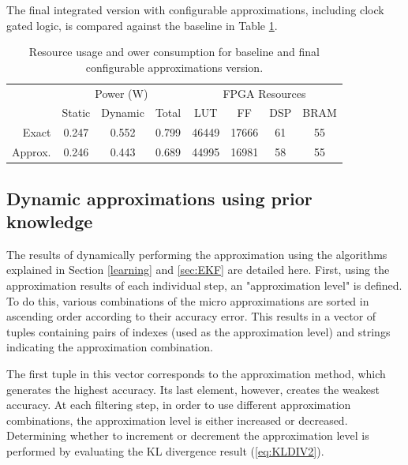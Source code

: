 \par The final integrated version with configurable approximations, including clock gated logic, is compared against the baseline in Table \ref{table:integrated}.

\begin{table}[h]
\begin{tabular}{r c c c c c c c}
\toprule
 & \multicolumn{3}{c}{Power (W)} & \multicolumn{4}{c}{FPGA Resources}\\
 & Static & Dynamic & Total & LUT & FF & DSP & BRAM\\
\hline
Exact & 0.247 & 0.552 & 0.799 & 46449 & 17666 & 61 & 55\\
Approx. & 0.246 & 0.443 & 0.689 & 44995 & 16981 & 58 & 55\\
\hline
\end{tabular}
\caption{Resource usage and ower consumption for baseline and final configurable approximations version.}
\label{table:integrated}
\end{table}





\subsection{Dynamic approximations using prior knowledge}
The results of dynamically performing the approximation using the algorithms explained in Section \ref{learning} and \ref{sec:EKF} are detailed here. First, using the approximation results of each individual step, an "approximation level" is defined. To do this, various combinations of the micro approximations are sorted in ascending order according to their accuracy error. This results in a vector of tuples containing pairs of indexes (used as the approximation level) and strings indicating the approximation combination. 

The first tuple in this vector corresponds to the approximation method, which generates the highest accuracy. Its last element, however, creates the weakest accuracy.
At each filtering step, in order to use different approximation combinations, the approximation level is either increased or decreased. Determining whether to increment or decrement the approximation level is performed by evaluating the KL divergence result (\ref{eq:KLDIV2}).


